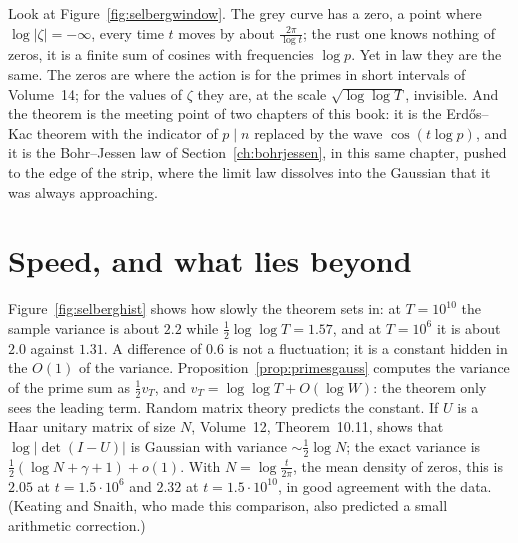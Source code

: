 \begin{beauty}
Look at Figure~\ref{fig:selbergwindow}. The grey curve has a zero, a point where $\log|\zeta|=-\infty$, every time $t$ moves by about $\frac{2\pi}{\log t}$; the rust one knows nothing of zeros, it is a finite sum of cosines with frequencies $\log p$. Yet in law they are the same. The zeros are where the action is for the primes in short intervals of Volume~14; for the values of $\zeta$ they are, at the scale $\sqrt{\log\log T}$, invisible. And the theorem is the meeting point of two chapters of this book: it is the Erd\H{o}s--Kac theorem with the indicator of $p\mid n$ replaced by the wave $\cos(t\log p)$, and it is the Bohr--Jessen law of Section~\ref{ch:bohrjessen}, in this same chapter, pushed to the edge of the strip, where the limit law dissolves into the Gaussian that it was always approaching.
\end{beauty}

\section{Speed, and what lies beyond}

Figure~\ref{fig:selberghist} shows how slowly the theorem sets in: at $T=10^{10}$ the sample variance is about $2.2$ while $\frac12\log\log T=1.57$, and at $T=10^6$ it is about $2.0$ against $1.31$. A difference of $0.6$ is not a fluctuation; it is a constant hidden in the $O(1)$ of the variance. Proposition~\ref{prop:primesgauss} computes the variance of the prime sum as $\frac12v_T$, and $v_T=\log\log T+O(\log W)$: the theorem only sees the leading term. Random matrix theory predicts the constant. If $U$ is a Haar unitary matrix of size $N$, Volume~12, Theorem~10.11, shows that $\log|\det(I-U)|$ is Gaussian with variance $\sim\frac12\log N$; the exact variance is $\frac12(\log N+\gamma+1)+o(1)$. With $N=\log\frac t{2\pi}$, the mean density of zeros, this is $2.05$ at $t=1.5\cdot10^6$ and $2.32$ at $t=1.5\cdot10^{10}$, in good agreement with the data. (Keating and Snaith, who made this comparison, also predicted a small arithmetic correction.)

